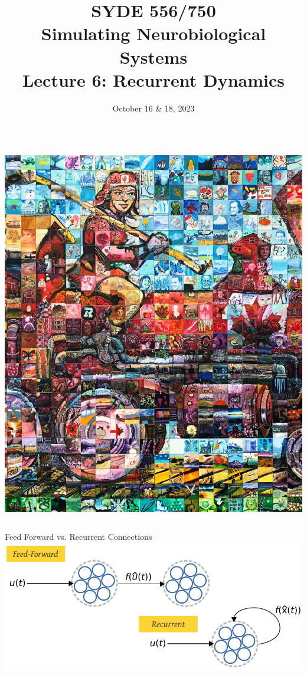 \documentclass[handout,aspectratio=169]{beamer}
\date{October 16 \& 18, 2023}
\title{SYDE 556/750 \\ Simulating Neurobiological Systems \\ Lecture 6: Recurrent Dynamics}
\begin{document}
	
	\begin{frame}{}
		\vspace{0.5cm}
		\begin{columns}[c]
			\MakeTitle
			\includegraphics[width=\textwidth]{media/canada_150_mosaic_engine_small.jpg}
		\end{columns}
	\end{frame}

	\begin{frame}{Feed Forward vs. Recurrent Connections}
		\centering
		\includegraphics{media/feed_forward_recurrent.pdf}
	\end{frame}
\end{document}
